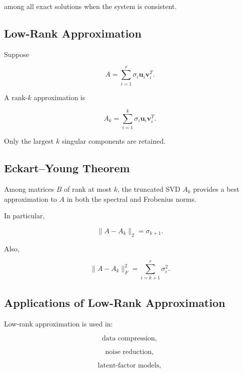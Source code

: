 among all exact solutions when the system is consistent.

\subsection{Low-Rank Approximation}
\label{subsec:low-rank-approximation}

Suppose

\[
A
=
\sum_{i=1}^{r}
\sigma_i
\mathbf{u}_i
\mathbf{v}_i^T.
\]

A rank-\(k\) approximation is

\[
\boxed{
A_k
=
\sum_{i=1}^{k}
\sigma_i
\mathbf{u}_i
\mathbf{v}_i^T.
}
\]

Only the largest \(k\) singular components are retained.

\subsection{Eckart--Young Theorem}
\label{subsec:eckart-young}

\begin{theorem}
Among matrices \(B\) of rank at most \(k\), the truncated SVD \(A_k\)
provides a best approximation to \(A\) in both the spectral and Frobenius
norms.
\end{theorem}

In particular,

\[
\boxed{
\|A-A_k\|_2
=
\sigma_{k+1}.
}
\]

Also,

\[
\boxed{
\|A-A_k\|_F^2
=
\sum_{i=k+1}^{r}
\sigma_i^2.
}
\]

\subsection{Applications of Low-Rank Approximation}
\label{subsec:low-rank-applications}

Low-rank approximation is used in:

\[
\boxed{
\text{data compression},
}
\]

\[
\boxed{
\text{noise reduction},
}
\]

\[
\boxed{
\text{latent-factor models},
}
\]

